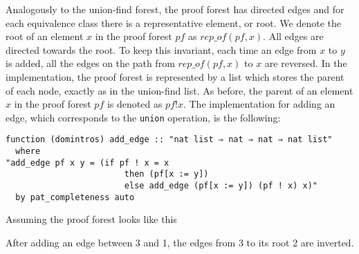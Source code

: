 Analogously to the union-find forest, the proof forest has directed edges and for each equivalence class there is a representative element, or root. We denote the root of an element $x$ in the proof forest $pf$ as $rep\_of(pf, x)$. All edges are directed towards the root. To keep this invariant, each time an edge from $x$ to $y$ is added, all the edges on the path from $rep\_of(pf, x)$ to $x$ are reversed.
In the implementation, the proof forest is represented by a list which stores the parent of each node, exactly as in the union-find list. As before, the parent of an element $x$ in the proof forest $pf$ is denoted as $pf ! x$. The implementation for adding an edge, which corresponds to the \lstinline{union} operation, is the following:

\begin{lstlisting}
function (domintros) add_edge :: "nat list ⇒ nat ⇒ nat ⇒ nat list"
  where
"add_edge pf x y = (if pf ! x = x
                        then (pf[x := y])
                        else add_edge (pf[x := y]) (pf ! x) x)"
  by pat_completeness auto
\end{lstlisting}

\begin{exmp}
Assuming the proof forest looks like this

\begin{center}
\end{center}


After adding an edge between 3 and 1, the edges from 3 to its root 2 are inverted.

\begin{center}
\end{center}
\end{exmp}


